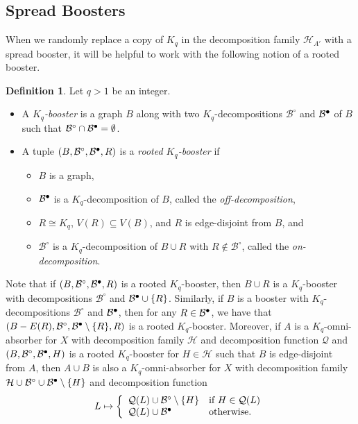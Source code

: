 \documentclass[11pt]{article}
\numberwithin{equation}{section}
\newcounter{i}
\theoremstyle{plain}
\theoremstyle{plain} %
\theoremstyle{definition}
\newtheorem{definition}[thm]{Definition}
\newcommand{\cQ}{\mathcal{Q}}
\newcommand{\cB}{\mathcal{B}}
\newcommand{\cH}{\mathcal{H}}
\newcommand\filledcirc{\ensuremath{{\bullet}\mathllap{\circ}}}
\begin{document}
\subsection{Spread Boosters}

When we randomly replace a copy of $K_q$ in the decomposition family $\cH_{A'}$ with a spread booster, it will be helpful to work with the following notion of a rooted booster.

\begin{definition}\label{def:Booster}Let $q > 1$ be an integer.
   \begin{itemize}
       \item A \textit{$K_q$-booster} is a graph $B$ along with two $K_q$-decompositions $\cB^{\circ}$ and $\cB^{\filledcirc}$ of $B$ such that $\cB^{\circ} \cap \cB^{\filledcirc} = \emptyset$.
       \item A tuple $(B, \cB^{\circ}, \cB^{\filledcirc}, R)$ is a \textit{rooted $K_q$-booster} if
       \begin{itemize}
           \item $B$ is a graph,
           \item $\cB^{\filledcirc}$ is a $K_q$-decomposition of $B$, called the \textit{off-decomposition},
           \item $R \cong K_q$, $V(R) \subseteq V(B)$, and $R$ is edge-disjoint from $B$, and
           \item $\cB^{\circ}$ is a $K_q$-decomposition of $B \cup R$ with $R \notin \cB^{\circ}$, called the \textit{on-decomposition}.
       \end{itemize}
   \end{itemize}    
\end{definition}
Note that if $(B, \cB^{\circ}, \cB^{\filledcirc}, R)$ is a rooted $K_q$-booster, then $B \cup R$ is a $K_q$-booster with decompositions $\cB^{\circ}$ and $\cB^{\filledcirc}\cup\{R\}$.  Similarly, if $B$ is a booster with $K_q$-decompositions $\cB^{\circ}$ and $\cB^{\filledcirc}$, then for any $R \in \cB^{\filledcirc}$, we have that $(B - E(R), \cB^{\circ}, \cB^{\filledcirc}\setminus\{R\}, R)$ is a rooted $K_q$-booster.  Moreover, if $A$ is a $K_q$-omni-absorber for $X$ with decomposition family $\cH$ and decomposition function $\cQ$ and $(B, \cB^{\circ}, \cB^{\filledcirc}, H)$ is a rooted $K_q$-booster for $H \in \cH$ such that $B$ is edge-disjoint from $A$, then $A \cup B$ is also a $K_q$-omni-absorber for $X$ with decomposition family $\cH \cup \cB^{\circ} \cup \cB^{\filledcirc} \setminus\{H\}$ and decomposition function 
\begin{equation*}
    L \mapsto \left\{\begin{array}{l l}
      \cQ(L) \cup \cB^{\circ} \setminus \{H\} & \text{if } H \in \cQ(L)\\
      \cQ(L) \cup \cB^{\filledcirc} & \text{otherwise.}
    \end{array}\right.
\end{equation*}
\end{document}
